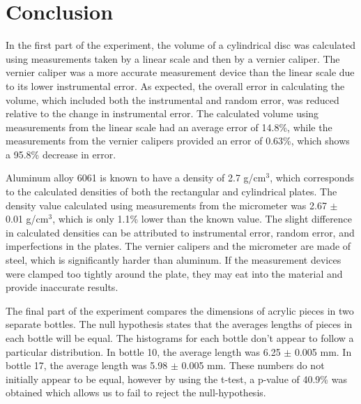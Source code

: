 \documentclass[12pt]{article}
\begin{document}
\section{Conclusion}
In the first part of the experiment, the volume of a cylindrical disc was calculated using measurements taken by a linear scale and then by a vernier caliper. The vernier caliper was a more accurate measurement device than the linear scale due to its lower instrumental error. As expected, the overall error in calculating the volume, which included both the instrumental and random error, was reduced relative to the change in instrumental error. The calculated volume using measurements from the linear scale had an average error of 14.8\%, while the measurements from the vernier calipers provided an error of 0.63\%, which shows a 95.8\% decrease in error.
\par Aluminum alloy 6061 is known to have a density of 2.7 g/cm$^3$, which corresponds to the calculated densities of both the rectangular and cylindrical plates. The density value calculated using measurements from the micrometer was 2.67 $\pm$ 0.01 g/cm$^3$, which is only 1.1\% lower than the known value. The slight difference in calculated densities can be attributed to instrumental error, random error, and imperfections in the plates. The vernier calipers and the micrometer are made of steel, which is significantly harder than aluminum. If the measurement devices were clamped too tightly around the plate, they may eat into the material and provide inaccurate results. 
\par The final part of the experiment compares the dimensions of acrylic pieces in two separate bottles. The null hypothesis states that the averages lengths of pieces in each bottle will be equal. The histograms for each bottle don't appear to follow a particular distribution. In bottle 10, the average length was 6.25 $\pm$ 0.005 mm. In bottle 17, the average length was 5.98 $\pm$ 0.005 mm. These numbers do not initially appear to be equal, however by using the t-test, a p-value of 40.9\% was obtained which allows us to fail to reject the null-hypothesis.
\newpage
\end{document}
